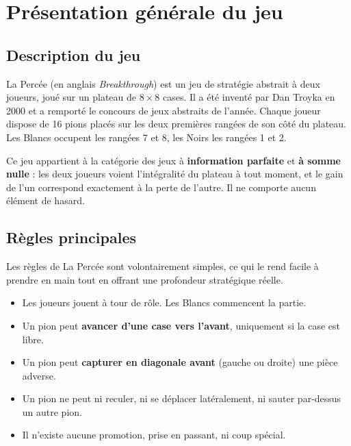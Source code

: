 \documentclass[a4paper,12pt]{report}
\begin{document}
\renewcommand{\contentsname}{Sommaire}
\tableofcontents
\setcounter{section}{0}
\renewcommand{\thesection}{\arabic{section}}

\section{Présentation générale du jeu}

\subsection{Description du jeu}

La Percée (en anglais \textit{Breakthrough}) est un jeu de stratégie abstrait à deux joueurs,
joué sur un plateau de $8 \times 8$ cases. Il a été inventé par Dan Troyka en 2000 et a remporté
le concours de jeux abstraits de l'année. Chaque joueur dispose de 16 pions placés sur les deux
premières rangées de son côté du plateau. Les Blancs occupent les rangées 7 et 8, les Noirs les
rangées 1 et 2.

Ce jeu appartient à la catégorie des jeux à \textbf{information parfaite} et \textbf{à somme nulle} :
les deux joueurs voient l'intégralité du plateau à tout moment, et le gain de l'un correspond
exactement à la perte de l'autre. Il ne comporte aucun élément de hasard.

\subsection{Règles principales}

Les règles de La Percée sont volontairement simples, ce qui le rend facile à prendre en main
tout en offrant une profondeur stratégique réelle.

\begin{itemize}
  \item Les joueurs jouent à tour de rôle. Les Blancs commencent la partie.
  \item Un pion peut \textbf{avancer d'une case vers l'avant}, uniquement si la case est libre.
  \item Un pion peut \textbf{capturer en diagonale avant} (gauche ou droite) une pièce adverse.
  \item Un pion ne peut ni reculer, ni se déplacer latéralement, ni sauter par-dessus un autre pion.
  \item Il n'existe aucune promotion, prise en passant, ni coup spécial.
\end{itemize}
\end{document}
